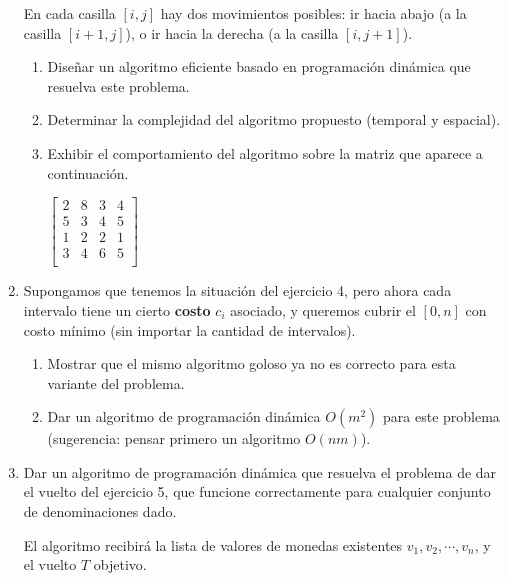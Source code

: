 \documentclass{article}
\begin{document}
\begin{enumerate}[resume]
            En cada casilla $[i,j]$ hay dos movimientos posibles: ir hacia abajo (a la casilla $[i+1,j]$), o ir hacia la derecha (a la casilla $[i,j+1]$).
               \begin{enumerate}
                   \item Diseñar un algoritmo eficiente basado en programación dinámica que resuelva este problema.
                   \item Determinar la complejidad del algoritmo propuesto (temporal y espacial).
                   \item Exhibir el comportamiento del algoritmo sobre la matriz que aparece a continuación.
                                 
                                 $\left [ \begin{array}{cccc} 
                                                2 & 8 & 3 & 4 \\ 
                                                5 & 3 & 4 & 5 \\ 
                                                1 & 2 & 2 & 1 \\ 
                                                3 & 4 & 6 & 5 \\ 
                                          \end{array} \right ]$
               \end{enumerate}
        \item Supongamos que tenemos la situación del ejercicio 4, pero ahora cada intervalo tiene un cierto \textbf{costo} $c_i$ asociado, y queremos cubrir el $[0,n]$ con costo mínimo (sin importar la cantidad de intervalos).
                \begin{enumerate}
                    \item Mostrar que el mismo algoritmo goloso ya no es correcto para esta variante del problema.
                    \item Dar un algoritmo de programación dinámica $O(m^2)$ para este problema (sugerencia: pensar primero un algoritmo $O(nm)$).
                \end{enumerate}
        \item Dar un algoritmo de programación dinámica que resuelva el problema de dar el vuelto del ejercicio 5, que funcione correctamente para cualquier conjunto de denominaciones dado.
        
              El algoritmo recibirá la lista de valores de monedas existentes $v_1, v_2, \cdots, v_n$, y el vuelto $T$ objetivo.
        

\end{enumerate}
\end{document}
